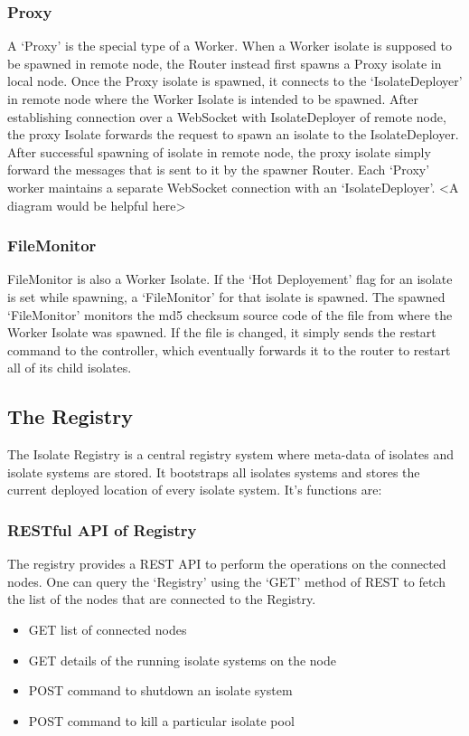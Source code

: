   \subsubsection{Proxy}
  A ‘Proxy’ is the special type of a Worker. When a Worker isolate is supposed to be spawned in remote node, the Router instead first spawns a Proxy isolate in local node. Once the Proxy isolate is spawned, it connects to the ‘IsolateDeployer’ in remote node where the Worker Isolate is intended to be spawned. After establishing connection over a WebSocket with IsolateDeployer of remote node, the proxy Isolate forwards the request to spawn an isolate to the IsolateDeployer. After successful spawning of isolate in remote node, the proxy isolate simply forward the messages that is sent to it by the spawner Router. Each ‘Proxy’ worker maintains a separate WebSocket connection with an ‘IsolateDeployer’.
  <A diagram would be helpful here>

  \subsubsection{FileMonitor}
  FileMonitor is also a Worker Isolate. If the ‘Hot Deployement’ flag for an isolate is set while spawning, a ‘FileMonitor’ for that isolate is spawned. The spawned ‘FileMonitor’ monitors the md5 checksum source code of the file from where the Worker Isolate was spawned. If the file is changed, it simply sends the restart command to the controller, which eventually forwards it to the router to restart all of its child isolates.


\subsection{The Registry}
The Isolate Registry is a central registry system where meta-data of isolates and isolate systems are stored. It bootstraps all isolates systems and stores the current deployed location of every isolate system. It’s functions are:
  \subsubsection{RESTful API of Registry}
  The registry provides a REST API to perform the operations on the connected nodes. One can query the ‘Registry’ using the ‘GET’ method of REST to fetch the list of the nodes that are connected to the Registry.
  \begin{itemize}
  \item GET list of connected nodes
  \item GET details of the running isolate systems on the node
  \item POST command to shutdown an isolate system
  \item POST command to kill a particular isolate pool
  \end{itemize}

